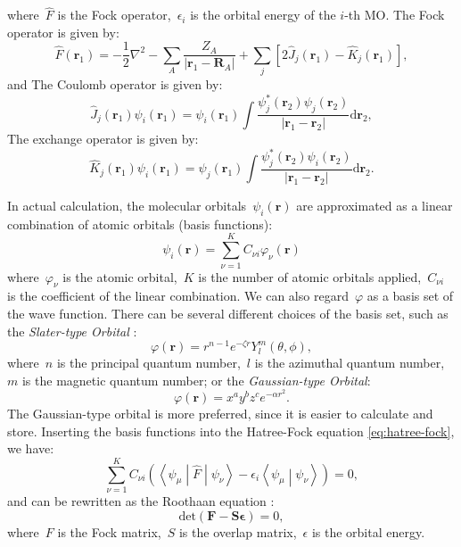 \documentclass[prb,preprintnumbers,amsmath,amssymb, 11pt]{revtex4}
\newcommand{\V}[1]{\boldsymbol{#1}} %
\newcommand{\abs}[1]{\left|#1\right|} %
\newcommand{\braket}[2]{\left\langle #1 \middle| #2 \right\rangle}
\newcommand{\bracket}[3]{\left\langle #1 \middle| #2 \middle| #3 \right\rangle}
\begin{document}
where~$\hat{F}$ is the Fock operator,~$\epsilon_i$ is the orbital energy of the $i$-th MO.
The Fock operator is given by:
\begin{equation}
    \hat{F}(\V{r}_1) = - \frac{1}{2} \nabla^2 - \sum_{A} \frac{Z_A}{\abs{\V{r}_1 - \mathbf{R}_A}} + \sum_{j} \left[ 2 \hat{J}_j(\V{r}_1) - \hat{K}_j(\V{r}_1) \right],
\end{equation}
and 
The Coulomb operator is given by:
\begin{equation}
    \hat{J}_j(\V{r}_1) \psi_i(\V{r}_1) = \psi_i(\V{r}_1) \int \frac{\psi_j^*(\V{r}_2) \psi_j(\V{r}_2)}{|\V{r}_1 - \V{r}_2|} \mathrm{d}\V{r}_2,
\end{equation}
The exchange operator is given by:
\begin{equation}
    \hat{K}_j(\V{r}_1) \psi_i(\V{r}_1) = \psi_j(\V{r}_1) \int \frac{\psi_j^*(\V{r}_2) \psi_i(\V{r}_2)}{|\V{r}_1 - \V{r}_2|} \mathrm{d}\V{r}_2.
\end{equation}

In actual calculation, the molecular orbitals~$\psi_i(\V{r})$ are approximated as a linear combination of atomic orbitals (basis functions):
\begin{equation}
    \psi_i(\mathbf{r}) = \sum_{\nu=1}^K C_{\nu i} \varphi_{\nu}(\mathbf{r})
\end{equation}
where~$\varphi_{\nu}$ is the atomic orbital,~$K$ is the number of atomic orbitals applied,~$C_{\nu i}$ is the coefficient of the linear combination.
We can also regard~$\varphi$ as a basis set of the wave function.
There can be several different choices of the basis set, such as the \textit{Slater-type Orbital} \cite{ira2000levine}:
\begin{equation}
    \varphi(\mathbf{r}) = r^{n - 1} e^{- \zeta r} Y_{l}^m(\theta,\phi),
\end{equation}
where~$n$ is the principal quantum number,~$l$ is the azimuthal quantum number,~$m$ is the magnetic quantum number; or the \textit{Gaussian-type Orbital}:
\begin{equation}
    \varphi(\mathbf{r}) = x^a y^b z^c e^{- \alpha r^2}.
\end{equation}
The Gaussian-type orbital is more preferred, since it is easier to calculate and store.
Inserting the basis functions into the Hatree-Fock equation \eqref{eq:hatree-fock}, we have:
\begin{equation}
    \sum_{\nu=1}^K C_{\nu i} \left( \bracket{\psi_\mu}{\hat{F}}{\psi_\nu} - \epsilon_i \braket{\psi_\mu}{\psi_\nu} \right) = 0,
\end{equation}
and can be rewritten as the Roothaan equation \cite{roothaan1951new}:
\begin{equation}\label{eq:roothaan}
    \mathrm{det} \left( \mathbf{F} - \mathbf{S} \mathbf{\epsilon} \right) = 0,
\end{equation}
where~$F$ is the Fock matrix,~$S$ is the overlap matrix,~$\epsilon$ is the orbital energy.
\end{document}
